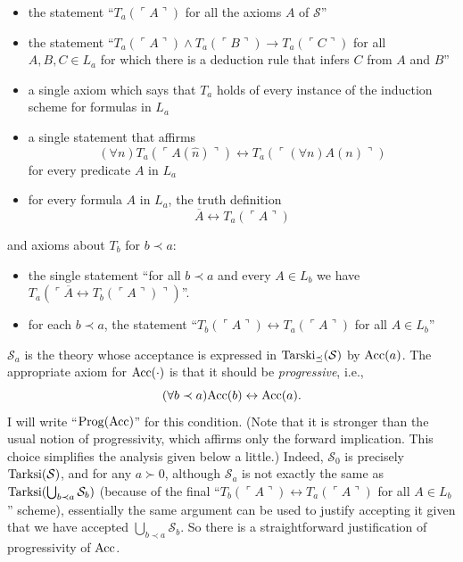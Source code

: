 \documentclass{amsart}
\begin{document}
\begin{itemize}
\item the statement ``$T_a(\ulcorner A\urcorner)$ for all the axioms $A$ of $\mathcal{S}$''

\item the statement ``$T_a(\ulcorner A\urcorner) \wedge T_a(\ulcorner B\urcorner) \to
T_a(\ulcorner C\urcorner)$ for all $A, B, C \in L_a$ for which there is a deduction rule that
infers $C$ from $A$ and $B$''

\item a single axiom which says that $T_a$ holds of every instance of the induction scheme for formulas
in $L_a$

\item a single statement that affirms
$$(\forall n)T_a(\ulcorner A(\hat{n})\urcorner) \leftrightarrow
T_a(\ulcorner (\forall n)A(n)\urcorner)$$
for every predicate $A$ in $L_a$

\item for every formula $A$ in $L_a$, the truth definition
$$\overline{A} \leftrightarrow T_a(\ulcorner A\urcorner)$$
\end{itemize}

\noindent and axioms about $T_b$ for $b \prec a$:

\begin{itemize}
\item the single statement ``for all $b \prec a$ and every $A \in L_b$ we have
$T_a(\ulcorner\overline{A} \leftrightarrow T_b(\ulcorner A\urcorner)\urcorner)$''.

\item for each $b \prec a$, the statement ``$T_b(\ulcorner A\urcorner) \leftrightarrow
T_a(\ulcorner A\urcorner)$ for all $A \in L_b$''
\end{itemize}

$\mathcal{S}_a$ is the theory whose acceptance is expressed in ${\rm Tarski}_{\preceq}(\mathcal{S})$ by
${\rm Acc}(a)$. The appropriate axiom for ${\rm Acc}(\cdot)$ is that it should be {\it progressive}, i.e.,
$$(\forall b \prec a){\rm Acc}(b) \leftrightarrow {\rm Acc}(a).$$
I will write ``${\rm Prog}({\rm Acc})$'' for this condition. (Note that it is stronger than the usual notion of
progressivity, which affirms only the forward implication. This choice simplifies the analysis given below a little.)
Indeed, $\mathcal{S}_0$ is precisely ${\rm Tarksi}(\mathcal{S})$, and for any $a \succ 0$, although
$\mathcal{S}_a$ is not exactly the same as ${\rm Tarksi}(\bigcup_{b \prec a} \mathcal{S}_b)$
(because of the final ``$T_b(\ulcorner A\urcorner) \leftrightarrow
T_a(\ulcorner A\urcorner)$ for all $A \in L_b$'' scheme),
essentially the same argument can be used to justify accepting it given that we have accepted
$\bigcup_{b \prec a} \mathcal{S}_b$. So there is a straightforward justification of progressivity of ${\rm Acc}$.
\end{document}
